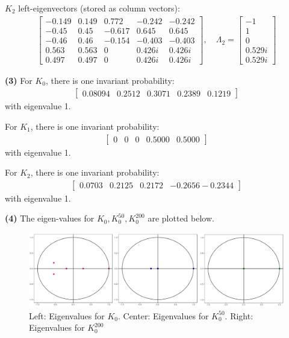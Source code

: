 \documentclass[5pt]{article}
\begin{document}
$K_2$ left-eigenvectors (stored as column vectors):
\begin{align*}
	\begin{bmatrix}
		-0.149	&	0.149	&	0.772	&	-0.242	&	-0.242 \\
		-0.45	&	0.45		&	-0.617	&	0.645	&	0.645 \\
		-0.46	&	0.46		&	-0.154	&	-0.403	&	-0.403 \\
		0.563	&	0.563	&	0		&	0.426i	&	0.426i \\
		0.497	&	0.497	&	0		&	0.426i	&	0.426i
	\end{bmatrix}, \quad \Lambda_2 = 
	\begin{bmatrix}
		-1	\\
		1	\\
		0	\\
		0.529i	\\
		0.529i	
	\end{bmatrix}
\end{align*}


\textbf{(3)} For $K_0$, there is one invariant probability:
\begin{align*}
	\begin{bmatrix}
		0.08094	&	0.2512		&	0.3071	&	0.2389	&	0.1219
	\end{bmatrix}
\end{align*}
with eigenvalue 1.


For $K_1$, there is one invariant probability:
\begin{align*}
	\begin{bmatrix}
		0	&	0  &	  0	&	0.5000	&	0.5000
	\end{bmatrix}
\end{align*}
with eigenvalue 1.

For $K_2$, there is one invariant probability:
\begin{align*}
	\begin{bmatrix}
		0.0703  &	0.2125	& 0.2172 	& -0.2656	-0.2344
	\end{bmatrix}
\end{align*}
with eigenvalue 1.


\textbf{(4)} The eigen-values for $K_0, K_0^{50}, K_{0}^{200}$ are plotted below. \\

\begin{figure}[H]
\begin{center}
\includegraphics[width = 1 \columnwidth]{eigen_values}
\caption{Left: Eigenvalues for $K_0$. Center: Eigenvalues for $K_0^{50}$. Right: Eigenvalues for $K_0^{200}$}
\end{center}
\end{figure}
\end{document}
